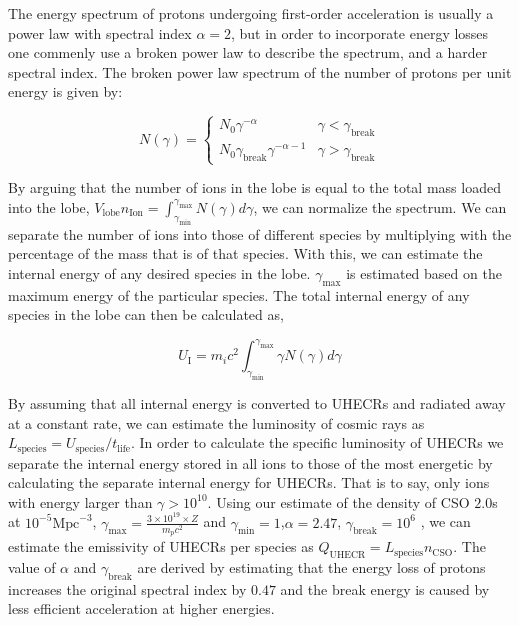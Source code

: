 The energy spectrum of protons undergoing first-order acceleration is usually a power law with spectral index $\alpha = 2$, but in order to incorporate energy losses one commenly use a broken power law to describe the spectrum, and a harder spectral index. The broken power law spectrum of the number of protons per unit energy is given by:

\begin{equation}
    \label{eq:proton_spectrum}
    N(\gamma) = \begin{cases}
    N_0 \gamma^{-\alpha} & \gamma < \gamma_{\text{break}} \\
    N_0 \gamma_{\text{break}}\gamma^{-\alpha-1} & \gamma > \gamma_{\text{break}}
    \end{cases}
\end{equation}

By arguing that the number of ions in the lobe is equal to the total mass loaded into the lobe, $V_{\text{lobe}} n_{\text{Ion}} = \int_{\gamma_{\text{min}}}^{\gamma_{\text{max}}} N(\gamma) d\gamma$, we can normalize the spectrum.  We can separate the number of ions into those of different species by multiplying with the percentage of the mass that is of that species. With this, we can estimate the internal energy of any desired species in the lobe. $\gamma_{\text{max}}$ is estimated based on the maximum energy of the particular species. The total internal energy of any species in the lobe can then be calculated as,

\begin{equation}
    U_{\text{I}} = m_i c^2 \int_{\gamma_{\text{min}}}^{\gamma_{\text{max}}} \gamma N(\gamma)d\gamma
\end{equation}

By assuming that all internal energy is converted to UHECRs and radiated away at a constant rate, we can estimate the luminosity of cosmic rays as $L_{\text{species}} = U_{\text{species}}/t_{\text{life}}$. In order to calculate the specific luminosity of UHECRs we separate the internal energy stored in all ions to those of the most energetic by calculating the separate internal energy for UHECRs. That is to say, only ions with energy larger than $\gamma > 10^{10}$. Using our estimate of the density of CSO $2.0$s at $10^{-5} \text{Mpc}^{-3}$, $\gamma_{\text{max}} = \frac{3 \times 10^{19} \times Z}{m_p c^2}$ and $\gamma_{\text{min}} = 1$,$\alpha =2.47$, $\gamma_{\text{break}}= 10^6$ , we can estimate the emissivity of UHECRs per species as $Q_{\text{UHECR}} = L_{\text{species}} n_{\text{CSO}}$. The value of $\alpha$ and $\gamma_{\text{break}}$ are derived by estimating that the energy loss of protons increases the original spectral index by $0.47$ and the break energy is caused by less efficient acceleration at higher energies.

